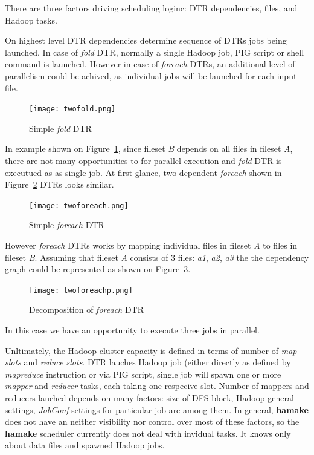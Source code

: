 \documentclass{article}
\begin{document}
There are three factors driving scheduling loginc: DTR dependencies,
files, and Hadoop tasks.

On highest level DTR dependencies determine sequence of DTRs jobs
being launched. In case of \emph{fold} DTR, normally a single Hadoop
job, PIG script or shell command is launched. However in case of
\emph{foreach} DTRs, an additional level of parallelism could be
achived, as individual jobs will be launched for each input file.

\begin{figure}[htp]
\centering
\texttt{[image: twofold.png]}
\caption{Simple \emph{fold} DTR}
\label{fig:fold1}
\end{figure}

In example shown on Figure~\ref{fig:fold1}, since fileset \textit{B}
depends on all files in fileset \textit{A}, there are not many
opportunities to for parallel execution and \emph{fold} DTR is
executued as as single job. At first glance, two dependent
\emph{foreach} shown in Figure~\ref{fig:foreach1} DTRs looks similar.

\begin{figure}[htp]
\centering
\texttt{[image: twoforeach.png]}
\caption{Simple \emph{foreach} DTR}
\label{fig:foreach1}
\end{figure}

However \emph{foreach} DTRs works by mapping individual files in
fileset \textit{A} to files in fileset \textit{B}. Assuming that
fileset \textit{A} consists of 3 files: \textit{a1}, \textit{a2},
\textit{a3} the the dependency graph could be represented as shown on
Figure~\ref{fig:foreach2}.

\begin{figure}[htp]
\centering
\texttt{[image: twoforeachp.png]}
\caption{Decomposition of \emph{foreach} DTR}
\label{fig:foreach2}
\end{figure}

In this case we have an opportunity to execute three jobs in parallel.

Unltimately, the Hadoop cluster capacity is defined in terms of number
of \textit{map slots} and \textit{reduce slots}.  DTR lauches Hadoop
job (either directly as defined by \emph{mapreduce} instruction or via
PIG script, single job will spawn one or more \emph{mapper} and
\emph{reducer} tasks, each taking one respecive slot. Number of
mappers and reducers lauched depends on many factors: size of DFS
block, Hadoop general settings, \emph{JobConf} settings for particular
job are among them. In general, \textbf{hamake} does not have an neither
visibility nor control over most of these factors, so the \textbf{hamake}
scheduler currently does not deal with invidual tasks. It knows only
about data files and spawned Hadoop jobs.
\end{document}
